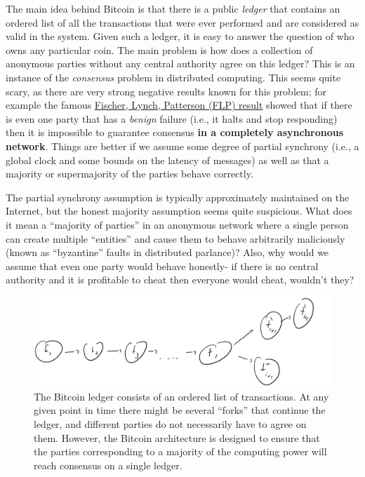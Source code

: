 The main idea behind Bitcoin is that there is a public \emph{ledger}
that contains an ordered list of all the transactions that were ever
performed and are considered as valid in the system. Given such a
ledger, it is easy to answer the question of who owns any particular
coin. The main problem is how does a collection of anonymous parties
without any central authority agree on this ledger? This is an instance
of the \emph{consensus} problem in distributed computing. This seems
quite scary, as there are very strong negative results known for this
problem; for example the famous
\href{http://the-paper-trail.org/blog/a-brief-tour-of-flp-impossibility/}{Fischer,
Lynch, Patterson (FLP) result} showed that if there is even one party
that has a \emph{benign} failure (i.e., it halts and stop responding)
then it is impossible to guarantee consensus \textbf{in a completely
asynchronous network}. Things are better if we assume some degree of
partial synchrony (i.e., a global clock and some bounds on the latency
of messages) as well as that a majority or supermajority of the parties
behave correctly.

The partial synchrony assumption is typically approximately maintained
on the Internet, but the honest majority assumption seems quite
suspicious. What does it mean a ``majority of parties'' in an anonymous
network where a single person can create multiple ``entities'' and cause
them to behave arbitrarily maliciously (known as ``byzantine'' faults in
distributed parlance)? Also, why would we assume that even one party
would behave honestly- if there is no central authority and it is
profitable to cheat then everyone would cheat, wouldn't they?

\begin{figure}
\centering
\includegraphics[width=\textwidth, height=0.25\paperheight, keepaspectratio]{../figure/Bitcoin_ledger.jpg}
\caption{The Bitcoin ledger consists of an ordered list of transactions.
At any given point in time there might be several ``forks'' that
continue the ledger, and different parties do not necessarily have to
agree on them. However, the Bitcoin architecture is designed to ensure
that the parties corresponding to a majority of the computing power will
reach consensus on a single ledger.}
\label{ledgerfig}
\end{figure}

